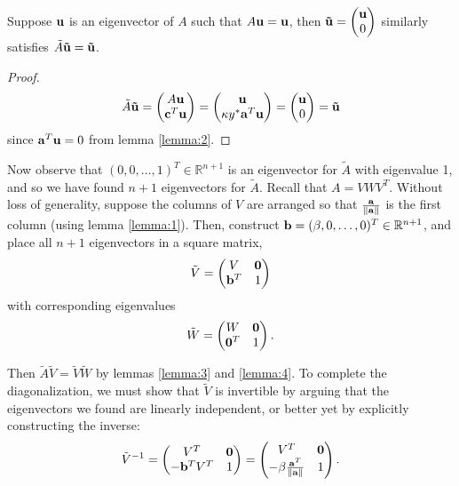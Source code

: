 \begin{lemma}\label{lemma:4} Suppose $\mathbf{u}$ is an eigenvector of $A$ such that $A\mathbf{u} = \mathbf{u}$, then $\mathbf{\tilde{u}} = \begin{pmatrix}\mathbf{u} \\ 0\end{pmatrix}$ similarly satisfies $\tilde{A}\mathbf{\tilde{u}} = \mathbf{\tilde{u}}$.\end{lemma}

\begin{proof}$$\tilde{A}\mathbf{\tilde{u}} = \begin{pmatrix}A\mathbf{u} \\ \mathbf{c}^T \mathbf{u} \end{pmatrix} = \begin{pmatrix}\mathbf{u} \\ \kappa y^* \mathbf{a}^T \mathbf{u} \end{pmatrix} = \begin{pmatrix}\mathbf{u} \\ 0 \end{pmatrix} = \mathbf{\tilde{u}}$$ since $\mathbf{a}^T \mathbf{u} = 0$ from lemma \ref{lemma:2}.\end{proof}

Now observe that $(0, 0, \ldots, 1)^T \in \mathbb{R}^{n+1}$ is an eigenvector for $\tilde{A}$ with eigenvalue 1, and so we have found $n+1$ eigenvectors for $\tilde{A}$. Recall that $A = VWV^T$. Without loss of generality, suppose the columns of $V$ are arranged so that $\frac{\mathbf{a}}{\|\mathbf{a}\|}$ is the first column (using lemma \ref{lemma:1}). Then, construct $\mathbf{b} = (\beta, 0, \ldots, 0)^T \in \mathbb{R}^{n+1}$, and place all $n+1$ eigenvectors in a square matrix,
$$\tilde{V} = \begin{pmatrix} V & \mathbf{0} \\ \mathbf{b}^T & 1\end{pmatrix}$$
with corresponding eigenvalues
$$\tilde{W} = \begin{pmatrix} W & \mathbf{0} \\ \mathbf{0}^T & 1\end{pmatrix}.$$

Then $\tilde{A}\tilde{V} = \tilde{V}\tilde{W}$ by lemmas \ref{lemma:3} and \ref{lemma:4}. To complete the diagonalization, we must show that $\tilde{V}$ is invertible by arguing that the eigenvectors we found are linearly independent, or better yet by explicitly constructing the inverse:
$$\tilde{V}^{-1} = \begin{pmatrix}V^T & \mathbf{0} \\- \mathbf{b}^T V^T & 1\end{pmatrix} = \begin{pmatrix}V^T & \mathbf{0} \\ - \beta \frac{\mathbf{a}^T}{\|\mathbf{a}\|} & 1\end{pmatrix}.$$ 

